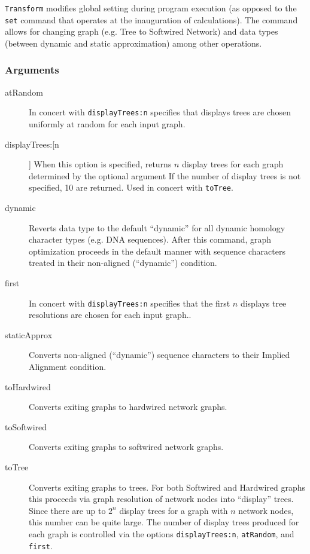 	\begin{phygdescription}
		{\texttt{Transform} modifies global setting during program execution (as opposed to the \texttt{set} 
		command that operates at the inauguration of calculations). The command allows for changing 
		graph (e.g. Tree to Softwired Network) and data types (between dynamic and static approximation) 
		among other operations.}
	\end{phygdescription}
			
	\subsubsection{Arguments}
		\begin{description}
			\item[atRandom] In concert with \texttt{displayTrees:n} specifies that displays trees are chosen 
			uniformly at random for each input graph.
			
			\item[displayTrees:[n]] When this option is specified, returns $n$ display trees for each graph 
			determined by the optional argument If the number of display trees is not 
			specified, 10 are returned. Used in concert with \texttt{toTree}.
			
			\item[dynamic] Reverts data type to the default ``dynamic'' for all dynamic homology 
			\citep{Wheeler2001} character types (e.g. DNA sequences). After this command, 
			graph optimization proceeds in the default manner with sequence characters treated 
			in their non-aligned (``dynamic'') condition.
			
			\item[first] In concert with \texttt{displayTrees:n} specifies that the first $n$ displays tree 
			resolutions are chosen for each input graph..
			
			\item[staticApprox] Converts non-aligned (``dynamic'') sequence characters to their Implied 
			Alignment \citep{Wheeler2003, WashburnandWheeler2020} condition.
			
			\item[toHardwired] Converts exiting graphs to hardwired network graphs.
			
			\item[toSoftwired] Converts exiting graphs to softwired network graphs.
			
			\item[toTree] Converts exiting graphs to trees. For both Softwired and Hardwired graphs 
			this proceeds via graph resolution of network nodes into ``display'' trees. Since there are up to 
			$2^n$ display trees for a graph with $n$ network nodes, this number can be quite large. 
			The number of display trees produced for each graph is controlled via the options 
			\texttt{displayTrees:n}, \texttt{atRandom}, and \texttt{first}. 
		\end{description}
			
